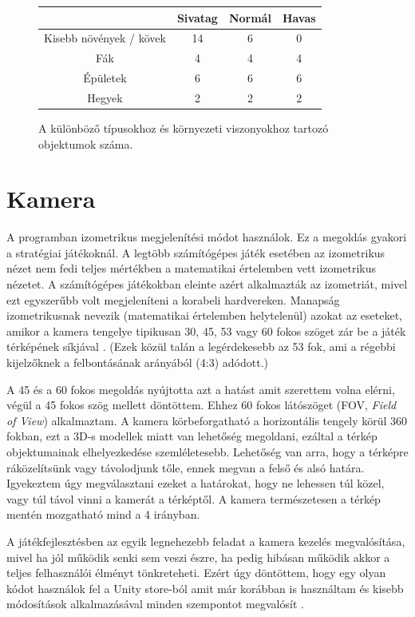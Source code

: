 \begin{figure}[h!]
  \centering
  \begin{tabular}{ | c | c | c | c | }
    \hline
     & Sivatag & Normál & Havas \\ \hline
    Kisebb növények / kövek & 14 & 6 & 0 \\ \hline
    Fák & 4 & 4 & 4 \\ \hline
    Épületek & 6 & 6 & 6 \\ \hline
    Hegyek & 2 & 2 & 2 \\ \hline
  \end{tabular}
  \caption{A különböző típusokhoz és környezeti viszonyokhoz tartozó objektumok száma.}
  \label{tab:models}
\end{figure}
 \newpage
\section{Kamera}

A programban izometrikus megjelenítési módot használok. Ez a megoldás gyakori a stratégiai játékoknál. A legtöbb számítógépes játék esetében az izometrikus nézet nem fedi teljes mértékben a matematikai értelemben vett izometrikus nézetet. A számítógépes játékokban eleinte azért alkalmazták az izometriát, mivel ezt egyszerűbb volt megjeleníteni a korabeli hardvereken. Manapság  izometrikusnak nevezik (matematikai értelemben helytelenül) azokat az eseteket, amikor a kamera tengelye tipikusan 30, 45, 53 vagy 60 fokos szöget zár be a játék térképének síkjával \cite{Isometic}. (Ezek közül talán a legérdekesebb az 53 fok, ami a régebbi kijelzőknek a felbontásának arányából (4:3) adódott.)

A 45 és a 60 fokos megoldás nyújtotta azt a hatást amit szerettem volna elérni, végül a 45 fokos szög mellett döntöttem. Ehhez 60 fokos látószöget (FOV, \textit{Field of View}) alkalmaztam. A kamera körbeforgatható a horizontális tengely körül 360 fokban, ezt a 3D-s modellek miatt van lehetőség megoldani, ezáltal a térkép objektumainak elhelyezkedése szemléletesebb. Lehetőség van arra, hogy a térképre ráközelítsünk vagy távolodjunk tőle, ennek megvan a felső és alsó határa. Igyekeztem úgy megválasztani ezeket a határokat, hogy ne lehessen túl közel, vagy túl távol vinni a kamerát a térképtől. A kamera természetesen a térkép mentén mozgatható mind a 4 irányban. 

A játékfejlesztésben az egyik legnehezebb feladat a kamera kezelés megvalósítása, mivel ha jól működik senki sem veszi észre, ha pedig hibásan működik akkor a teljes felhasználói élményt tönkreteheti. Ezért úgy döntöttem, hogy egy olyan kódot használok fel a Unity store-ból amit már korábban is használtam és kisebb módosítások alkalmazásával minden szempontot megvalósít \cite{RTS_Camera}.

